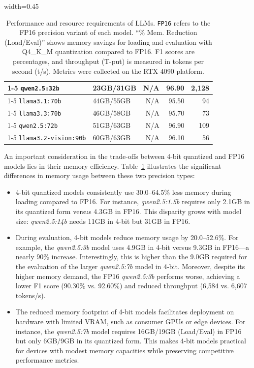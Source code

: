 \documentclass[conference]{IEEEtran}
\begin{document}
\begin{table}[htbp]
\begin{adjustbox}{width=0.45\textwidth}
\begin{tabular}{llrrr}
\cmidrule(lr){1-5}
\texttt{qwen2.5:32b} & 23GB/31GB & N/A & 96.90 & 2,128 \\
\cmidrule(lr){1-5}
\texttt{llama3.1:70b} & 44GB/55GB & N/A & 95.50 & 94 \\
\cmidrule(lr){1-5}
\texttt{llama3.3:70b} & 46GB/58GB & N/A & 95.70 & 73 \\
\cmidrule(lr){1-5}
\texttt{qwen2.5:72b} & 51GB/63GB & N/A & 96.90 & 109 \\
\cmidrule(lr){1-5}
\texttt{llama3.2-vision:90b} & 60GB/63GB & N/A & 96.10 & 56 \\
\bottomrule
\end{tabular}
\end{adjustbox}
\caption{Performance and resource requirements of LLMs. \texttt{FP16} refers to the FP16 precision variant of each model. “\% Mem. Reduction (Load/Eval)” shows memory savings for loading and evaluation with Q4\_K\_M quantization compared to FP16. F1 scores are percentages, and throughput (T-put) is measured in tokens per second (t/s). Metrics were collected on the RTX 4090 platform.}
\label{tab:model_memory_footprints}
\end{table}

An important consideration in the trade-offs between 4-bit quantized and FP16 models lies in their memory efficiency. Table~\ref{tab:model_memory_footprints} illustrates the significant differences in memory usage between these two precision types:

\begin{itemize}
    \item 4-bit quantized models consistently use 30.0--64.5\% less memory during loading compared to FP16. For instance, \textit{qwen2.5:1.5b} requires only 2.1GB in its quantized form versus 4.3GB in FP16. This disparity grows with model size: \textit{qwen2.5:14b} needs 11GB in 4-bit but 31GB in FP16.

    \item During evaluation, 4-bit models reduce memory usage by 20.0--52.6\%. For example, the \textit{qwen2.5:3b} model uses 4.9GB in 4-bit versus 9.3GB in FP16—a nearly 90\% increase. Interestingly, this is higher than the 9.0GB required for the evaluation of the larger \textit{qwen2.5:7b} model in 4-bit. Moreover, despite its higher memory demand, the FP16 \textit{qwen2.5:3b} performs worse, achieving a lower F1 score (90.30\% vs. 92.60\%) and reduced throughput (6,584 vs. 6,607 tokens/s).

    \item The reduced memory footprint of 4-bit models facilitates deployment on hardware with limited VRAM, such as consumer GPUs or edge devices. For instance, the \textit{qwen2.5:7b} model requires 16GB/19GB (Load/Eval) in FP16 but only 6GB/9GB in its quantized form. This makes 4-bit models practical for devices with modest memory capacities while preserving competitive performance metrics.
\end{itemize}
\end{document}

